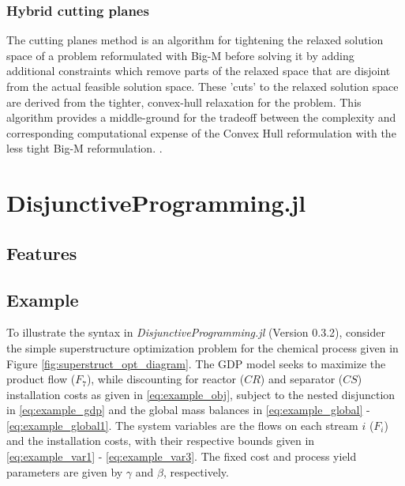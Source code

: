 \documentclass{juliacon}
\begin{document}
\subsubsection{Hybrid cutting planes}
The cutting planes method is an algorithm for tightening the relaxed solution space of a problem reformulated with Big-M before solving it by adding additional constraints which remove parts of the relaxed space that are disjoint from the actual feasible solution space. These 'cuts' to the relaxed solution space are derived from the tighter, convex-hull relaxation for the problem. This algorithm provides a middle-ground for the tradeoff between the complexity and corresponding computational expense of the Convex Hull reformulation with the less tight Big-M reformulation. \cite{trespalacios_grossmann_2016}. 
\vskip 6pt


\section{DisjunctiveProgramming.jl}
\subsection{Features}


\subsection{Example}
To illustrate the syntax in \textit{DisjunctiveProgramming.jl} (Version 0.3.2), consider the simple superstructure optimization problem for the chemical process given in Figure \ref{fig:superstruct_opt_diagram}. The GDP model seeks to maximize the product flow ($F_7$), while discounting for reactor ($CR$) and separator ($CS$) installation costs as given in \eqref{eq:example_obj}, subject to the nested disjunction in \eqref{eq:example_gdp} and the global mass balances in \eqref{eq:example_global}
- \eqref{eq:example_global1}. The system variables are the flows on each stream $i$ ($F_i$) and the installation costs, with their respective bounds given in \eqref{eq:example_var1} - \eqref{eq:example_var3}. The fixed cost and process yield parameters are given by $\gamma$ and $\beta$, respectively.
\vskip 6pt
\end{document}
